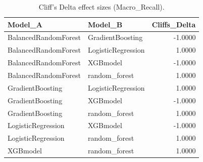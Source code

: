 \begin{table}[t]
\centering
\begin{tabular}{llr}
\toprule
Model_A & Model_B & Cliffs_Delta \\
\midrule
BalancedRandomForest & GradientBoosting & -1.0000 \\
BalancedRandomForest & LogisticRegression & 1.0000 \\
BalancedRandomForest & XGBmodel & -1.0000 \\
BalancedRandomForest & random_forest & 1.0000 \\
GradientBoosting & LogisticRegression & 1.0000 \\
GradientBoosting & XGBmodel & -1.0000 \\
GradientBoosting & random_forest & 1.0000 \\
LogisticRegression & XGBmodel & -1.0000 \\
LogisticRegression & random_forest & 1.0000 \\
XGBmodel & random_forest & 1.0000 \\
\bottomrule
\end{tabular}
\caption{Cliff's Delta effect sizes (Macro_Recall).}
\label{tab:cliffs_Macro_Recall}
\end{table}